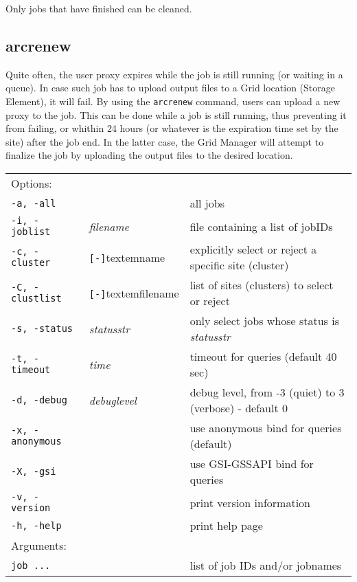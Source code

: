 Only jobs that have finished can be cleaned.

\subsection{arcrenew}
\label{sec:arcrenew}

Quite often, the user proxy expires while the job is still running (or
waiting in a queue). In case such job has to upload output files to a
Grid location (Storage Element), it will fail. By using the \texttt{arcrenew}
 command, users can upload
a new proxy to the job. This can be done while a job is still running,
thus preventing it from failing, or whithin 24 hours (or whatever is
the expiration time set by the site) after the job
end. In the latter case, the Grid Manager will attempt to finalize
the job by uploading the output files to the desired location.

\hspace*{0.5cm}
\begin{shaded}
\end{shaded}
\begin{longtable}{llp{8cm}}
   Options:&&\\
   \texttt{-a, -all}& & all jobs\\
   \texttt{-i, -joblist}& \textit{filename} & file containing a list of jobIDs\\
   \texttt{-c, -cluster}&\verb#[-]#textem{name}&explicitly select or reject a specific site (cluster)\\
   \texttt{-C, -clustlist}&\verb#[-]#textem{filename}&list of sites (clusters) to select or reject\\
   \texttt{-s, -status}& \textit{statusstr} &only select jobs whose status is \textit{statusstr}\\
   \texttt{-t, -timeout}& \textit{time} & timeout for queries (default 40 sec)\\
   \texttt{-d, -debug}& \textit{debuglevel} &debug level, from -3 (quiet) to 3 (verbose) - default 0\\
   \texttt{-x, -anonymous}& & use anonymous bind for queries (default)\\
   \texttt{-X, -gsi}& & use GSI-GSSAPI bind for queries\\
   \texttt{-v, -version}& & print version information\\
   \texttt{-h, -help}& & print help page\\
   Arguments:&&\\
   \texttt{job ...} && list of job IDs and/or jobnames\\
\end{longtable}

